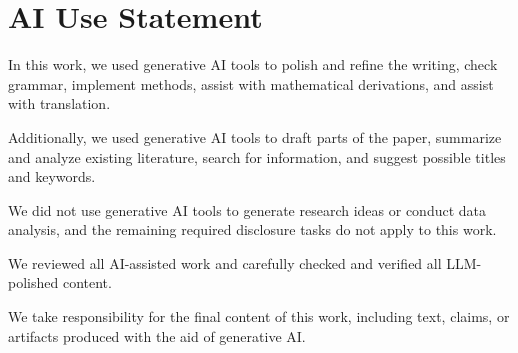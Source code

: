 \section*{AI Use Statement}
\label{appendix: use_llms}
In this work, we used generative AI tools to polish and refine the writing, check grammar, implement methods, assist with mathematical derivations, and assist with translation.

Additionally, we used generative AI tools to draft parts of the paper, summarize and analyze existing literature, search for information, and suggest possible titles and keywords.

We did not use generative AI tools to generate research ideas or conduct data analysis, and the remaining required disclosure tasks do not apply to this work. 

We reviewed all AI-assisted work and carefully checked and verified all LLM-polished content. 

We take responsibility for the final content of this work, including text, claims, or artifacts produced with the aid of generative AI.